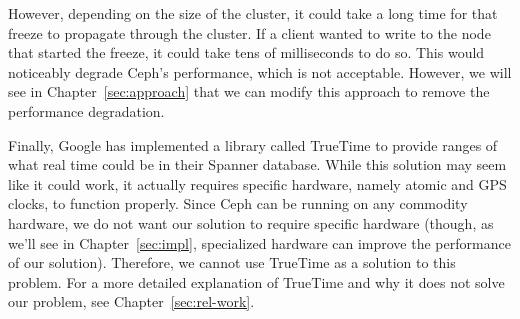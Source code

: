 However, depending on the size of the cluster, it could take a long time for 
that freeze to propagate through the cluster. If a client wanted to write to  
the node that started the freeze, it could take tens of milliseconds to do so. 
This would noticeably degrade Ceph's performance, which is not acceptable. 
However, we will see in Chapter~\ref{sec:approach} that we can modify this 
approach to remove the performance degradation.

Finally, Google has implemented a library called TrueTime to provide ranges of 
what real time could be in their Spanner database. While this solution may seem like
it could work, it actually requires specific hardware, namely atomic and GPS
clocks, to function properly. Since Ceph can be running on any commodity hardware, we do
not want our solution to require specific hardware (though, as we'll see in 
Chapter~\ref{sec:impl}, specialized hardware can improve the performance of
our solution). Therefore, we cannot use TrueTime as a solution to this 
problem. For a more detailed explanation of TrueTime and why it does not solve 
our problem, see Chapter~\ref{sec:rel-work}.














